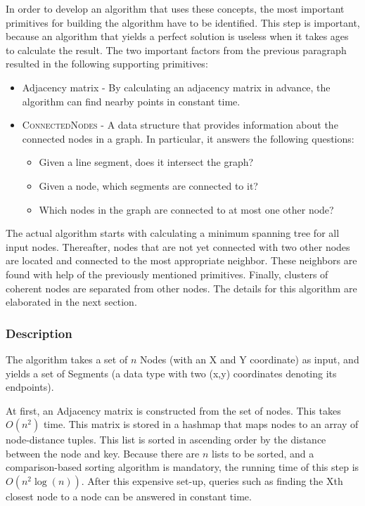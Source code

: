 \documentclass[11pt]{article}
\begin{document}
In order to develop an algorithm that uses these concepts, the most important primitives for building the algorithm have to be identified. This step is important, because an algorithm that yields a perfect solution is useless when it takes ages to calculate the result. The two important factors from the previous paragraph resulted in the following supporting primitives:

\begin{itemize}
\item Adjacency matrix - By calculating an adjacency matrix in advance, the algorithm can find nearby points in constant time.
\item \textsc{ConnectedNodes} - A data structure that provides information about the connected nodes in a graph. In particular, it answers the following questions:
\begin{itemize}
\item Given a line segment, does it intersect the graph?
\item Given a node, which segments are connected to it?
\item Which nodes in the graph are connected to at most one other node?
\end{itemize}
\end{itemize}

The actual algorithm starts with calculating a minimum spanning tree for all input nodes. Thereafter, nodes that are not yet connected with two other nodes are located and connected to the most appropriate neighbor. These neighbors are found with help of the previously mentioned primitives. Finally, clusters of coherent nodes are separated from other nodes. The details for this algorithm are elaborated in the next section.

\subsubsection{Description}
The algorithm takes a set of $n$ Nodes (with an X and Y coordinate) as input, and yields a set of Segments (a data type with two (x,y) coordinates denoting its endpoints).

At first, an Adjacency matrix is constructed from the set of nodes. This takes $O(n^2)$ time. This matrix is stored in a hashmap that maps nodes to an array of node-distance tuples. This list is sorted in ascending order by the distance between the node and key. Because there are $n$ lists to be sorted, and a comparison-based sorting algorithm is mandatory, the running time of this step is $O(n^2 \log(n))$. After this expensive set-up, queries such as finding the Xth closest node to a node can be answered in constant time.
\end{document}

